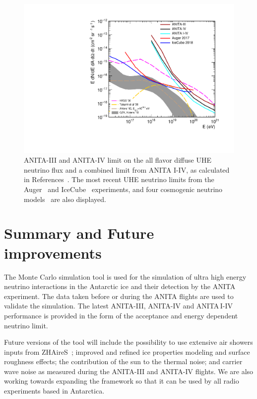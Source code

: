 \begin{figure}[!h]\centering
 \includegraphics[width=.65\linewidth]{./Figs/Limit4icemcPaper.pdf}
 \caption{
 ANITA-III and ANITA-IV limit on the all flavor diffuse UHE neutrino flux and a combined limit from ANITA I-IV, as calculated in References~\cite{anita3cosmogenic,anita4cosmogenic}.
 The most recent UHE neutrino limits
from the Auger~\cite{auger2017} and IceCube~\cite{icecube2018} experiments, and
four cosmogenic neutrino models~\cite{kkss2002,takami2009,ahlers2012,kotera2010cosmogenic} are also displayed. 
}
 \label{fig:sensitivity}
\end{figure}

\section{Summary and Future improvements}
\label{sec:future}
The \icemc Monte Carlo simulation tool is used for the
simulation of ultra high energy neutrino interactions in the Antarctic
ice and their detection by the ANITA experiment.
The data taken before or during the ANITA flights are used to validate the
simulation.
The latest ANITA-III, ANITA-IV and ANITA\,I-IV performance is provided in the form of the
acceptance and energy dependent neutrino limit.
 
Future versions of the tool will include the possibility to use extensive air showers inputs from ZHAireS~\cite{alvarez2012monte}; improved and refined ice properties modeling and surface roughness effects; the contribution of the sun to the thermal noise; and carrier wave noise as measured during the ANITA-III and ANITA-IV flights.
We are also working towards expanding the framework so that it can be used by all radio experiments based in Antarctica.

